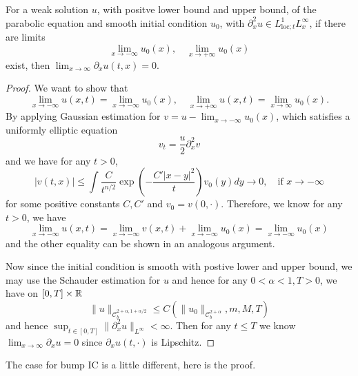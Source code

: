 \begin{lemma}
    For a weak solution $u$, with positve lower bound and upper bound, of the parabolic equation and smooth initial condition $u_0$, with $\partial_x^2 u \in L^1_{\text{loc};t}L^{\infty}_x$, if there are limits
    \[
    \lim_{x\to -\infty} u_0(x),\quad \lim_{x\to +\infty}u_0(x)
    \]
    exist, then $\lim_{x\to \infty} \partial_x u(t,x) = 0$.
\end{lemma}
\begin{proof}
    We want to show that
    \[
        \lim_{x\to-\infty} u(x,t) = \lim_{x\to -\infty} u_0(x),\quad \lim_{x\to+\infty} u(x,t) = \lim_{x\to \infty}u_0(x).
    \]
    By applying Gaussian estimation for $v = u - \lim_{x\to -\infty} u_0(x)$, which satisfies a uniformly elliptic equation
    \[v_t = \dfrac u2 \partial_x^2 v\]
    and we have for any $t>0$,
    \[
        |v(t,x)| \leq \int \dfrac{C}{t^{n/2}}\exp{\left(-\dfrac{C'|x-y|^2}{t}\right)}v_0(y) dy \to 0,\quad\text{if }x\to -\infty
    \]
    for some positive constants $C,C'$ and $v_0 = v(0,\cdot)$. Therefore, we know for any $t>0$, we have
    \[
    \lim_{x\to-\infty} u(x,t) = \lim_{x\to -\infty}v(x,t) + \lim_{x\to -\infty} u_0(x) = \lim_{x\to -\infty} u_0(x)
    \]
    and the other equality can be shown in an analogous argument.\par
    Now since the initial condition is smooth with postive lower and upper bound, we may use the Schauder estimation for $u$ and hence for any $0 < \alpha < 1, T>0$, we have on $[0,T]\times\mathbb{R}$
    \[
    \lVert u\rVert_{\mathcal{C}^{2+\alpha,1+\alpha/2}_b} \leq C(\lVert u_0\rVert_{\mathcal{C}^{2+\alpha}_b},m,M,T)
    \]
    and hence $\sup_{t\in[0,T]} \lVert\partial^2_x u\rVert_{L^{\infty}} < \infty$. Then for any $t \leq T$ we know $\lim_{x\to\infty} \partial_x u = 0$ since $\partial_x u(t,\cdot)$ is Lipschitz.
\end{proof}

The case for bump IC is a little different, here is the proof.

